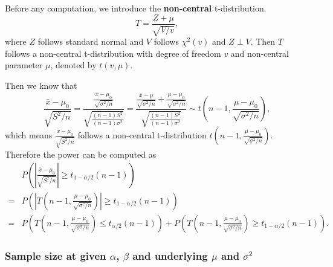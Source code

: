 \documentclass[a4paper,12pt]{article}
\begin{document}
Before any computation, we introduce the \textbf{non-central} t-distribution.
\begin{equation}
  \label{eq:noncentral-t-definition}
  T = \frac{Z + \mu}{\sqrt{V / v}}
  ,  
\end{equation}
where $Z$ follows standard normal and $V$ follows $\chi^2\left(v\right)$ and $Z\perp V$. Then $T$ follows a non-central t-distribution with degree of freedom $v$ and non-central parameter $\mu$, denoted by $t\left(v, \mu\right)$.
\par
Then we know that
\[
  \frac{\bar{x} - \mu_0}{\sqrt{S^2 / n}}
  = \frac{
    \frac{\bar{x} - \mu_0}{\sqrt{\sigma^2 / n}}
  }{
    \sqrt{
      \frac{\left(n - 1\right)S^2}{\left(n - 1\right)\sigma^2}
    }
  }
  = \frac{
    \frac{\bar{x} - \mu}{\sqrt{\sigma^2 / n}}
    + \frac{\mu - \mu_0}{\sqrt{\sigma^2 / n}}
  }{
    \sqrt{
      \frac{\left(n - 1\right)S^2}{\left(n - 1\right)\sigma^2}
    }
  }
  \sim t\left(n - 1, \frac{\mu - \mu_0}{\sqrt{\sigma^2 / n}}\right)
  ,
\]
which means $\frac{\bar{x} - \mu_0}{\sqrt{S^2 / n}}$ follows a non-central t-distribution $t\left(n - 1, \frac{\mu - \mu_0}{\sqrt{\sigma^2 / n}}\right)$. Therefore the power can be computed as
\begin{equation}
  \label{eq:power_equation_one_sample_sigma_unknown}
  \begin{aligned}
    & P\left(
      \left|
      \frac{\bar{x} - \mu_0}{\sqrt{S^2 / n}}
      \right|
      \geq t_{1 - \alpha / 2}\left(n - 1\right)
      \right)    \\
    =& P\left(
       \left|
       T\left(n - 1,  \frac{\mu - \mu_0}{\sqrt{\sigma^2 / n}}\right)
       \right|
       \geq t_{1 - \alpha / 2}\left(n - 1\right)
       \right)    \\
    =& P\left(
       T\left(n - 1,  \frac{\mu - \mu_0}{\sqrt{\sigma^2 / n}}\right)
       \leq t_{\alpha / 2}\left(n - 1\right)
       \right)
       + P\left(
       T\left(n - 1,  \frac{\mu - \mu_0}{\sqrt{\sigma^2 / n}}\right)
       \geq t_{1 - \alpha / 2}\left(n - 1\right)
       \right)
       .
  \end{aligned}  
\end{equation}

\subsubsection{Sample size at given $\alpha$, $\beta$ and underlying $\mu$ and $\sigma^2$}
\label{sec:sample-size-at-1}
\end{document}
